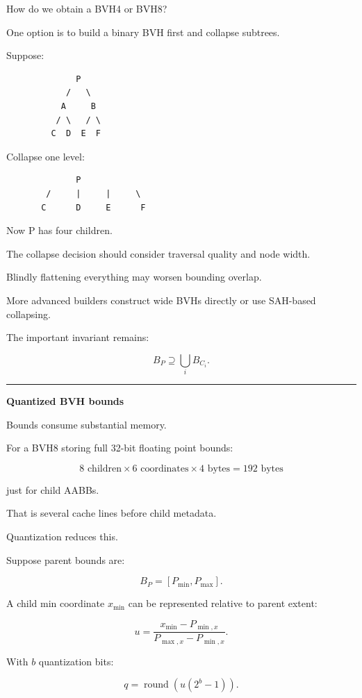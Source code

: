 How do we obtain a BVH4 or BVH8?

One option is to build a binary BVH first and collapse subtrees.

Suppose:

\begin{verbatim}
              P
            /   \
           A     B
          / \   / \
         C  D  E  F
\end{verbatim}

Collapse one level:

\begin{verbatim}
              P
        /     |     |     \
       C      D     E      F
\end{verbatim}

Now P has four children.

The collapse decision should consider traversal quality and node width.

Blindly flattening everything may worsen bounding overlap.

More advanced builders construct wide BVHs directly or use SAH-based collapsing.

The important invariant remains:

\[
B_P
\supseteq
\bigcup_iB_{C_i}.
\]

\begin{center}\rule{0.5\linewidth}{0.5pt}\end{center}

\textbf{Quantized BVH bounds}

Bounds consume substantial memory.

For a BVH8 storing full 32-bit floating point bounds:

\[
8\text{ children}
\times
6\text{ coordinates}
\times
4\text{ bytes}
=
192\text{ bytes}
\]

just for child AABBs.

That is several cache lines before child metadata.

Quantization reduces this.

Suppose parent bounds are:

\[
B_P=[P_{\min},P_{\max}].
\]

A child min coordinate \(x_{\min}\) can be represented relative to parent extent:

\[
u=
\frac{x_{\min}-P_{\min,x}}
{P_{\max,x}-P_{\min,x}}.
\]

With \(b\) quantization bits:

\[
q=
\operatorname{round}
\left(
u(2^b-1)
\right).
\]

